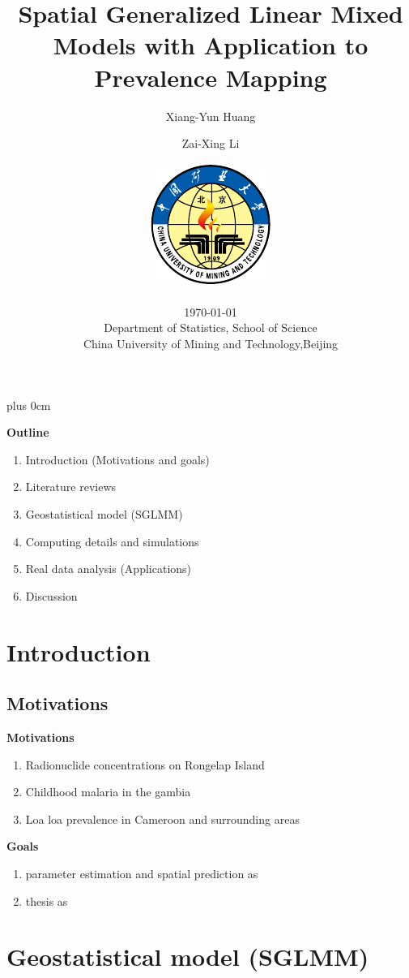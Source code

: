 \documentclass[11pt,compress,UTF8]{beamer}
\title{Spatial Generalized Linear Mixed Models with Application to Prevalence Mapping}
\author{Xiang-Yun Huang \and Zai-Xing Li}
\date{\includegraphics[width=10ex,interpolate=true]{logo} \\ ~~ \\
\today \\ Department of Statistics, School of Science \\ China University of Mining and Technology,Beijing}
\renewcommand{\raggedright}{\leftskip=0pt \rightskip=0pt plus 0cm} %
\begin{document}
\raggedright

\maketitle

\begin{frame}
\textbf{Outline}
\begin{enumerate}
  \item Introduction (Motivations and goals)
  \item Literature reviews  
  \item Geostatistical model (SGLMM)
  \item Computing details and simulations
  \item Real data analysis (Applications)
  \item Discussion
\end{enumerate}
\end{frame}


\section{Introduction}

\subsection{Motivations}

\begin{frame}
\textbf{Motivations}

\begin{enumerate}
\item Radionuclide concentrations on Rongelap Island
\item Childhood malaria in the gambia
\item Loa loa prevalence in Cameroon and surrounding areas
\end{enumerate}

\textbf{Goals}
\begin{enumerate}
\item parameter estimation and spatial prediction as \citet{Diggle2016}
\item thesis as \citet{Varin2005}
\end{enumerate}

\end{frame}


\section{Geostatistical model (SGLMM)}
\end{document}
